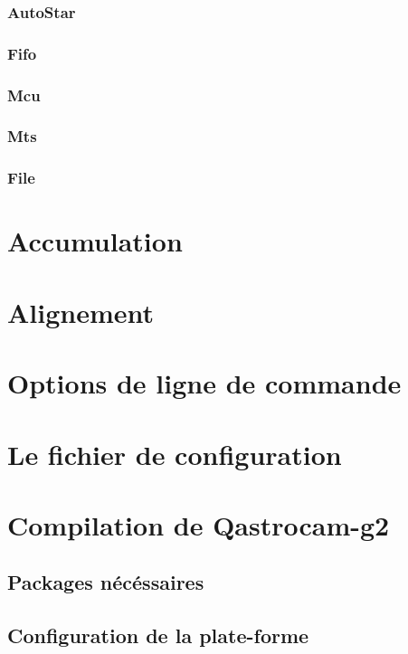 \documentclass[11pt,a4paper]{book}
\begin{document}
\subsection{AutoStar}

\subsection{Fifo}

\subsection{Mcu}

\subsection{Mts}

\subsection{File}

\chapter{Accumulation}

\chapter{Alignement}

\chapter{Options de ligne de commande}

\chapter{Le fichier de configuration}

\appendix

\chapter{Compilation de Qastrocam-g2}

\section{Packages n\'ec\'essaires}

\section{Configuration de la plate-forme}
\end{document}
